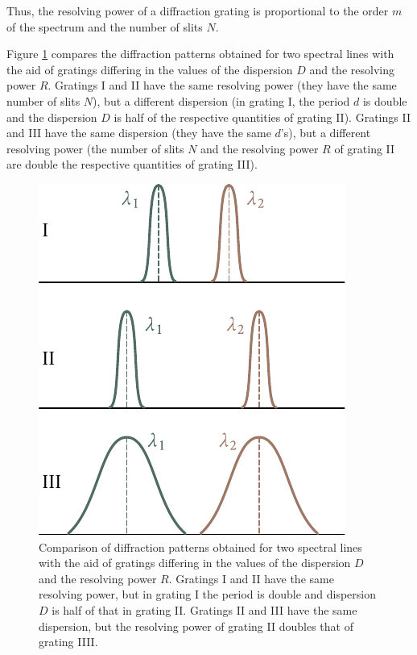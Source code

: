 \noindent
Thus, the resolving power of a diffraction grating is proportional to the order $m$ of the spectrum and the number of slits $N$.

Figure \ref{fig:18_38} compares the diffraction patterns obtained for two spectral lines with the aid of gratings differing in the values of the dispersion $D$ and the resolving power $R$.
Gratings I and II have the same resolving power (they have the same number of slits $N$), but a different dispersion (in grating I, the period $d$ is double and the dispersion $D$ is half of the respective quantities of grating II).
Gratings II and III have the same dispersion (they have the same $d$'s), but a different resolving power (the number of slits $N$ and the resolving power $R$ of grating II are double the respective quantities of grating III).

\begin{figure}[!htb]
	\begin{center}
		\includegraphics[scale=1.0]{figures/ch_18/fig_18_38.pdf}
        \caption[]{Comparison of diffraction patterns obtained for two spectral lines with the aid of gratings differing in the values of the dispersion $D$ and the resolving power $R$. Gratings I and II have the same resolving power, but in grating I the period is double and dispersion $D$ is half of that in grating II. Gratings II and III have the same dispersion, but the resolving power of grating II doubles that of grating IIII.}
		\label{fig:18_38}
	\end{center}
	\vspace{-0.8cm}
\end{figure}

